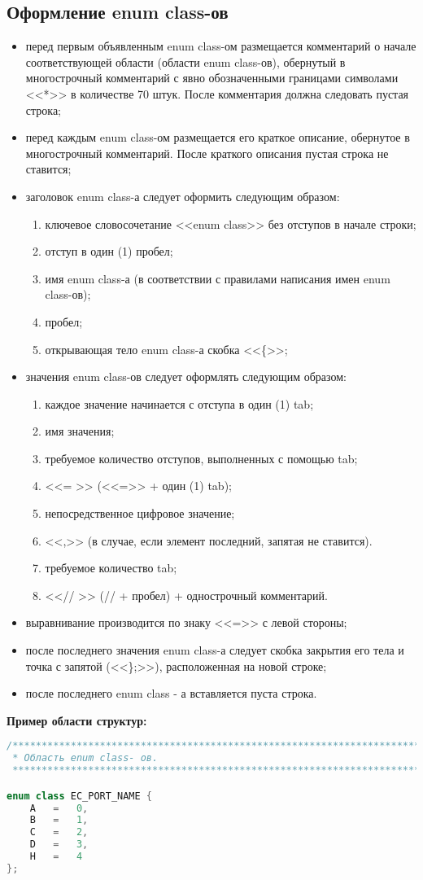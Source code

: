 \subsection{Оформление enum class-ов}
\begin{itemize}
	\item перед первым объявленным enum class-ом размещается комментарий о начале соответствующей области (области enum class-ов), обернутый в многострочный комментарий с явно обозначенными границами символами <<*>> в количестве 70 штук. После комментария должна следовать  пустая строка;
	\item перед каждым enum class-ом размещается его краткое описание, обернутое в многострочный комментарий. После краткого описания пустая строка не ставится;
	\item заголовок enum class-а следует оформить следующим образом:
	\begin{enumerate}
		\item ключевое словосочетание <<enum class>> без отступов в начале строки;
		\item отступ в один (1) пробел;
		\item имя enum class-а (в соответствии с правилами написания имен enum class-ов);
		\item пробел;
		\item открывающая тело enum class-а скобка <<\{>>;
	\end{enumerate}
	\item значения enum class-ов следует оформлять следующим образом:
	\begin{enumerate}
		\item каждое значение начинается с отступа в один (1) tab;
		\item имя значения;
		\item требуемое количество отступов, выполненных с помощью tab;
		\item <<=	>> (<<=>> + один (1) tab);
		\item непосредственное цифровое значение;
		\item <<,>> (в случае, если элемент последний, запятая не ставится).
		\item требуемое количество tab;
		\item <<// >> (// + пробел) + однострочный комментарий.
	\end{enumerate}
	\item выравнивание производится по знаку <<=>> с левой стороны;
	\item после последнего значения enum class-а следует скобка закрытия его тела и точка с запятой (<<\};>>), расположенная на новой строке;
	\item после последнего enum class - а вставляется пуста строка.
\end{itemize}\textbf{Пример области структур:}\begin{lstlisting}[language=C++, frame=tlBR, basicstyle=\fontsize{10}{10}\ttfamily]
/**********************************************************************
 * Область enum class- ов.
 **********************************************************************/

enum class EC_PORT_NAME {
	A	=	0,
	B	=	1,
	C	=	2,
	D	=	3,
	H	=	4
};\end{lstlisting}